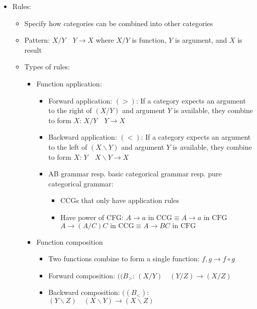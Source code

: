 \begin{itemize}
\begin{itemize}
\begin{itemize}
        \end{itemize}
    \end{itemize}
    \item Rules:
    \begin{itemize}
        \item Specify how categories can be combined into other categories
        \item Pattern: $X / Y \quad Y \to X$ where $X / Y$ is function, $Y$ is argument, and $X$ is result
        \item Types of rules:
        \begin{itemize}
            \item Function application:
            \begin{itemize}
                \item Forward application: $(>)$: If a category expects an argument to the right of $(X / Y)$ and argument $Y$ is available, they combine to form $X$: $X / Y \quad Y \to X$
                \item Backward application: $(<)$: If a category expects an argument to the left of $(X \backslash Y)$ and argument $Y$ is available, they combine to form $X$: $Y \quad X \backslash Y\to X$
                \item AB grammar resp. basic categorical grammar resp. pure categorical grammar:
                \begin{itemize}
                    \item CCGs that only have application rules
                    \item Have power of CFG:
                    $
                    A \to a \text{ in CCG} \equiv A \to a \text{ in CFG}
                    $\\
                    $
                    A \to (A / C) C \text{ in CCG} \equiv A \to BC \text{ in CFG}
                    $
                \end{itemize}
            \end{itemize}
            \item Function composition
            \begin{itemize}
                \item Two functions combine to form a single function: $f, g \to f \circ g$
                \item Forward composition: $((B_>$: $(X / Y) \quad (Y / Z) \to (X / Z)$
                \item Backward composition: $((B_<)$: $(Y \backslash Z) \quad (X \backslash Y) \to (X \backslash Z)$

\end{itemize}
\end{itemize}
\end{itemize}
\end{itemize}

